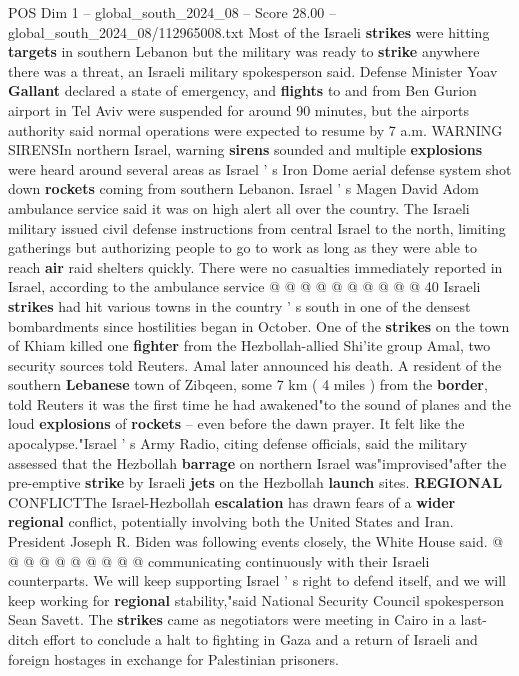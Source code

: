 \begin{textsample}{POS Dim 1 – global\_south\_2024\_08 – Score 28.00 – global\_south\_2024\_08/112965008.txt}
Most of the Israeli \textbf{strikes} were hitting \textbf{targets} in southern Lebanon but the military was ready to \textbf{strike} anywhere there was a threat, an Israeli military spokesperson said.
Defense Minister Yoav \textbf{Gallant} declared a state of emergency, and \textbf{flights} to and from Ben Gurion airport in Tel Aviv were suspended for around 90 minutes, but the airports authority said normal operations were expected to resume by 7 a.m.
WARNING SIRENSIn northern Israel, warning \textbf{sirens} sounded and multiple \textbf{explosions} were heard around several areas as Israel ' s Iron Dome aerial defense system shot down \textbf{rockets} coming from southern Lebanon.
Israel ' s Magen David Adom ambulance service said it was on high alert all over the country.
The Israeli military issued civil defense instructions from central Israel to the north, limiting gatherings but authorizing people to go to work as long as they were able to reach \textbf{air} raid shelters quickly.
There were no casualties immediately reported in Israel, according to the ambulance service @ @ @ @ @ @ @ @ @ @ 40 Israeli \textbf{strikes} had hit various towns in the country ' s south in one of the densest bombardments since hostilities began in October.
One of the \textbf{strikes} on the town of Khiam killed one \textbf{fighter} from the Hezbollah-allied Shi'ite group Amal, two security sources told Reuters.
Amal later announced his death.
A resident of the southern \textbf{Lebanese} town of Zibqeen, some 7 km ( 4 miles ) from the \textbf{border}, told Reuters it was the first time he had awakened"to the sound of planes and the loud \textbf{explosions} of \textbf{rockets} -- even before the dawn prayer.
It felt like the apocalypse."Israel ' s Army Radio, citing defense officials, said the military assessed that the Hezbollah \textbf{barrage} on northern Israel was"improvised"after the pre-emptive \textbf{strike} by Israeli \textbf{jets} on the Hezbollah \textbf{launch} sites. \textbf{REGIONAL} CONFLICTThe Israel-Hezbollah \textbf{escalation} has drawn fears of a \textbf{wider} \textbf{regional} conflict, potentially involving both the United States and Iran.
President Joseph R.
Biden was following events closely, the White House said. @ @ @ @ @ @ @ @ @ @ communicating continuously with their Israeli counterparts.
We will keep supporting Israel ' s right to defend itself, and we will keep working for \textbf{regional} stability,"said National Security Council spokesperson Sean Savett.
The \textbf{strikes} came as negotiators were meeting in Cairo in a last-ditch effort to conclude a halt to fighting in Gaza and a return of Israeli and foreign hostages in exchange for Palestinian prisoners.

\end{textsample}
